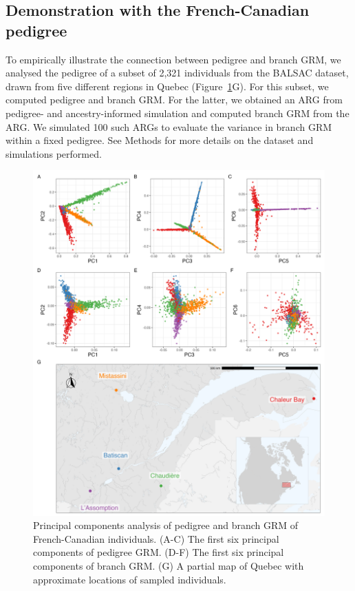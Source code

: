 
\subsection{Demonstration with the French-Canadian pedigree}

To empirically illustrate the connection between pedigree and branch GRM,
we analysed the pedigree of a subset of 2,321 individuals from the BALSAC dataset,
drawn from five different regions in Quebec (Figure~\ref{fig:PCA_map}G).
%
For this subset, we computed pedigree and branch GRM.
%
For the latter, we obtained an ARG from pedigree- and ancestry-informed simulation
and computed branch GRM from the ARG.
%
We simulated 100 such ARGs to evaluate the variance in branch GRM within a fixed pedigree.
See Methods for more details on the dataset and simulations performed.


\begin{figure}
    \centering
    \includegraphics[width = \textwidth]{Figures/map_and_pca_grid4.jpg}
    \caption{Principal components analysis of pedigree and branch GRM of French-Canadian individuals.
    (A-C) The first six principal components of pedigree GRM.
    (D-F) The first six principal components of branch GRM.
    (G) A partial map of Quebec with approximate locations of sampled individuals. \label{fig:PCA_map}}
\end{figure}

